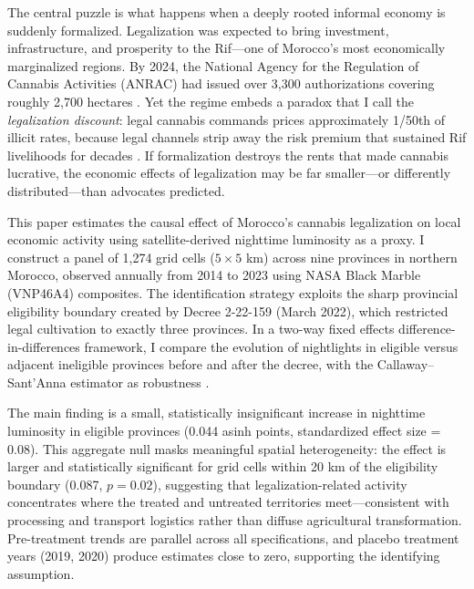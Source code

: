 \documentclass[12pt]{article}
\begin{document}
The central puzzle is what happens when a deeply rooted informal economy is suddenly formalized. Legalization was expected to bring investment, infrastructure, and prosperity to the Rif---one of Morocco's most economically marginalized regions. By 2024, the National Agency for the Regulation of Cannabis Activities (ANRAC) had issued over 3,300 authorizations covering roughly 2,700 hectares \citep{GlobalInitiative2024}. Yet the regime embeds a paradox that I call the \textit{legalization discount}: legal cannabis commands prices approximately 1/50th of illicit rates, because legal channels strip away the risk premium that sustained Rif livelihoods for decades \citep{Chouvy2008, Afsahi2017}. If formalization destroys the rents that made cannabis lucrative, the economic effects of legalization may be far smaller---or differently distributed---than advocates predicted.

This paper estimates the causal effect of Morocco's cannabis legalization on local economic activity using satellite-derived nighttime luminosity as a proxy. I construct a panel of 1,274 grid cells ($5 \times 5$ km) across nine provinces in northern Morocco, observed annually from 2014 to 2023 using NASA Black Marble (VNP46A4) composites. The identification strategy exploits the sharp provincial eligibility boundary created by Decree 2-22-159 (March 2022), which restricted legal cultivation to exactly three provinces. In a two-way fixed effects difference-in-differences framework, I compare the evolution of nightlights in eligible versus adjacent ineligible provinces before and after the decree, with the Callaway--Sant'Anna estimator as robustness \citep{CallawayS2021}.

The main finding is a small, statistically insignificant increase in nighttime luminosity in eligible provinces (0.044 asinh points, standardized effect size = 0.08). This aggregate null masks meaningful spatial heterogeneity: the effect is larger and statistically significant for grid cells within 20 km of the eligibility boundary (0.087, $p = 0.02$), suggesting that legalization-related activity concentrates where the treated and untreated territories meet---consistent with processing and transport logistics rather than diffuse agricultural transformation. Pre-treatment trends are parallel across all specifications, and placebo treatment years (2019, 2020) produce estimates close to zero, supporting the identifying assumption.
\end{document}
